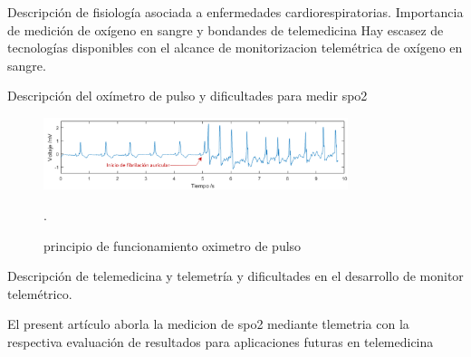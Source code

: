 \documentclass[journal]{IEEEtran}
\begin{document}
Descripción de fisiología asociada a enfermedades cardiorespiratorias.
Importancia de medición de oxígeno en sangre y bondandes de telemedicina
Hay escasez de tecnologías disponibles con el alcance de monitorizacion telemétrica de oxígeno en sangre.

Descripción del oxímetro de pulso y dificultades para medir spo2

\begin{figure}[!h]
	\centering
	\includegraphics[width=3.5in]{mis_senales2.png}
	\caption{principio de funcionamiento oximetro de pulso \cite{physiobank} }.
	
	\label{imagen_ecg}
\end{figure}

Descripción de telemedicina y telemetría y dificultades en el desarrollo de monitor telemétrico.


El present artículo aborla la medicion de spo2 mediante tlemetria con la respectiva evaluación de resultados para aplicaciones futuras en telemedicina 







\end{document}
